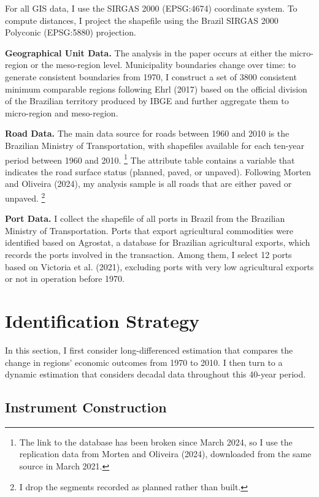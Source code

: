 \documentclass[11pt]{article}
\begin{document}
\vspace{0.3cm}
\noindent For all GIS data, I use the SIRGAS 2000 (EPSG:4674) coordinate system. To compute distances, I project the shapefile using the Brazil SIRGAS 2000 Polyconic (EPSG:5880) projection.

\textbf{Geographical Unit Data.} The analysis in the paper occurs at either the micro-region or the meso-region level. Municipality boundaries change over time: to generate consistent boundaries from 1970, I construct a set of 3800 consistent minimum comparable regions following Ehrl (2017) based on the official division of the Brazilian territory produced by IBGE and further aggregate them to micro-region and meso-region.

\textbf{Road Data.} The main data source for roads between 1960 and 2010 is the Brazilian Ministry of Transportation, with shapefiles available for each ten-year period between 1960 and 2010. \footnote{The link to the database has been broken since March 2024, so I use the replication data from Morten and Oliveira (2024), downloaded from the same source in March 2021.} The attribute table contains a variable that indicates the road surface status (planned, paved, or unpaved). Following Morten and Oliveira (2024), my analysis sample is all roads that are either paved or unpaved. \footnote{I drop the segments recorded as planned rather than built.}

\textbf{Port Data.} I collect the shapefile of all ports in Brazil from the Brazilian Ministry of Transportation. Ports that export agricultural commodities were identified based on Agrostat, a database for Brazilian agricultural exports, which records the ports involved in the transaction. Among them, I select 12 ports based on Victoria et al. (2021), excluding ports with very low agricultural exports or not in operation before 1970.

\section{Identification Strategy}

In this section, I first consider long-differenced estimation that compares the change in regions' economic outcomes from 1970 to 2010. I then turn to a dynamic estimation that considers decadal data throughout this 40-year period.

\subsection{Instrument Construction}
\label{sec:instrument}
\end{document}

